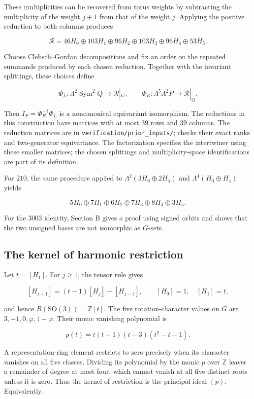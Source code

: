 \documentclass[11pt,a4paper]{article}
\begin{document}
These multiplicities can be recovered from torus weights by subtracting the multiplicity of the weight \(j+1\) from that of the weight \(j\). Applying the positive reduction to both columns produces

\[
\mathcal R=46H_0\oplus103H_1\oplus96H_2
\oplus103H_3\oplus96H_4\oplus53H_5.
\]

Choose Clebsch--Gordan decompositions and fix an order on the repeated summands produced by each chosen reduction. Together with the invariant splittings, these choices define

\[
\Phi_L:\Lambda^2\operatorname{Sym}^2Q\longrightarrow\mathcal R|_G,
\qquad
\Phi_R:\Lambda^5\Lambda^2P\longrightarrow\mathcal R|_G.
\]

Then $I_F=\Phi_R^{-1}\Phi_L$ is a noncanonical equivariant isomorphism. The reductions in this construction have matrices with at most \(39\) rows and \(39\) columns. The reduction matrices are in \texttt{verification/prior\_inputs/};  checks their exact ranks and two-generator equivariance. The factorization specifies the intertwiner using these smaller matrices; the chosen splittings and multiplicity-space identifications are part of its definition.

For \(210\), the same procedure applied to \(\Lambda^2(3H_0\oplus2H_4)\) and \(\Lambda^4(H_0\oplus H_4)\) yields

\[
5H_0\oplus7H_1\oplus6H_2\oplus7H_3\oplus8H_4\oplus3H_5.
\]

For the \(3003\) identity, Section B gives a proof using signed orbits and shows that the two unsigned bases are not isomorphic as \(G\)-sets.

\subsection{The kernel of harmonic restriction}\label{subsec:F4}

Let \(t=[H_1]\). For \(j\ge1\), the tensor rule gives

\[
[H_{j+1}]=(t-1)[H_j]-[H_{j-1}],\qquad [H_0]=1,\quad[H_1]=t,
\]

and hence \(R(\mathrm{SO}(3))=\mathbb Z[t]\). The five rotation-character values on \(G\) are \(3,-1,0,\varphi,1-\varphi\). Their monic vanishing polynomial is

\[
p(t)=t(t+1)(t-3)(t^2-t-1).
\]

A representation-ring element restricts to zero precisely when its character vanishes on all five classes. Dividing its polynomial by the monic \(p\) over \(\mathbb Z\) leaves a remainder of degree at most four, which cannot vanish at all five distinct roots unless it is zero. Thus the kernel of restriction is the principal ideal \((p)\). Equivalently,
\end{document}
